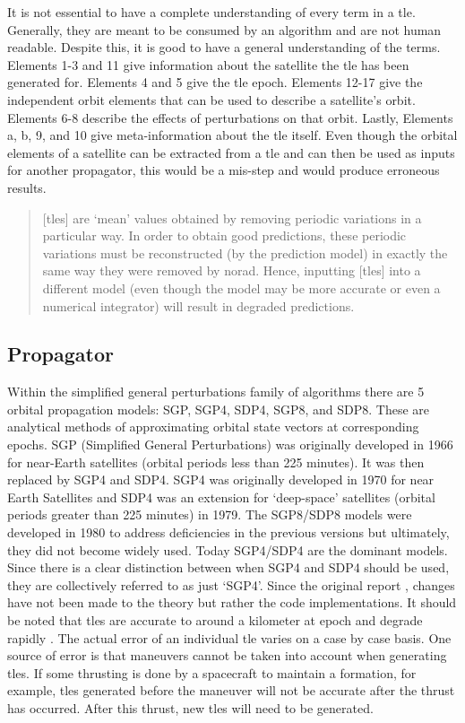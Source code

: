 It is not essential to have a complete understanding of every term in a
\gls{tle}. Generally, they are meant to be consumed by an algorithm and are not
human readable. Despite this, it is good to have a general understanding of the
terms.  Elements 1-3 and 11 give information about the satellite the \gls{tle}
has been generated for. Elements 4 and 5 give the \gls{tle} epoch.  Elements
12-17 give the independent orbit elements that can be used to describe a
satellite's orbit. Elements 6-8 describe the effects of perturbations on that
orbit. Lastly, Elements a, b, 9, and 10 give meta-information about the
\gls{tle} itself. Even though the orbital elements of a satellite can be
extracted from a \gls{tle} and can then be used as inputs for another
propagator, this would be a mis-step and would produce erroneous results. 

\begin{quote}
[\glspl{tle}] are `mean' values obtained by removing
periodic variations in a particular way. In order to obtain good predictions,
these periodic variations must be reconstructed (by the prediction model) in
exactly the same way they were removed by \gls{norad}. Hence, inputting
[\glspl{tle}] into a different model (even though the model may be more accurate or even
a numerical integrator) will result in degraded predictions. \cite{hoots_spacetrack_1980}
\end{quote}


\subsection{Propagator}

Within the simplified general perturbations family of algorithms there are 5
orbital propagation models: SGP, SGP4, SDP4, SGP8, and SDP8. These are
analytical methods of approximating orbital state vectors at corresponding
epochs. SGP (Simplified General Perturbations) was originally developed in 1966
for near-Earth satellites (orbital periods less than 225 minutes). It was then
replaced by SGP4 and SDP4.  SGP4 was originally developed in 1970 for near
Earth Satellites and SDP4 was an extension for `deep-space' satellites (orbital
periods greater than 225 minutes) in 1979.  The SGP8/SDP8 models were developed
in 1980 to address deficiencies in the previous versions but ultimately, they
did not become widely used.  Today SGP4/SDP4 are the dominant models.  Since
there is a clear distinction between when SGP4 and SDP4 should be used, they
are collectively referred to as just `SGP4'. Since the original report
\cite{hoots_spacetrack_1980}, changes have not been made to the theory but
rather the code implementations.  It should be noted that \glspl{tle} are
accurate to around a kilometer at epoch and degrade rapidly
\cite{vallado_revisiting_2006}. The actual error of an individual \gls{tle}
varies on a case by case basis. One source of error is that maneuvers cannot be
taken into account when generating \glspl{tle}. If some thrusting is done by a
spacecraft to maintain a formation, for example, \glspl{tle} generated before
the maneuver will not be accurate after the thrust has occurred. After this
thrust, new \glspl{tle} will need to be generated. 



